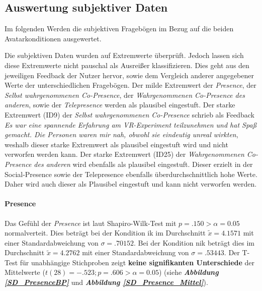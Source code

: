 \documentclass[a4paper,11pt]{article}%
\renewcommand{\\}{\vspace*{0.5\baselineskip} \newline}
\begin{document}

\newpage
\subsection{Auswertung subjektiver Daten}
Im folgenden Werden die subjektiven Fragebögen im Bezug auf die beiden Avatarkonditionen ausgewertet.

Die subjektiven Daten wurden auf Extremwerte überprüft. Jedoch lassen sich diese Extremwerte nicht pauschal als Ausreißer klassifizieren. Dies geht aus den jeweiligen Feedback der Nutzer hervor, sowie dem Vergleich anderer angegebener Werte der unterschiedlichen Fragebögen. Der milde Extremwert der \textit{Presence}, der \textit{Selbst wahrgenommenen Co-Presence}, der \textit{Wahrgenommenen Co-Presence des \dq{}anderen\dq{}}, sowie der \textit{Telepresence} werden als plausibel eingestuft.
Der starke Extremwert (ID9) der \textit{Selbst wahrgenommenen Co-Presence} schrieb als Feedback \dq{}\textit{Es war eine spannende Erfahrung am VR-Experiment teilzunehmen und hat Spaß gemacht. Die Personen waren mir nah, obwohl sie eindeutig unreal wirkten}\dq{}, weshalb dieser starke Extremwert als plausibel eingestuft wird und nicht verworfen werden kann.
Der starke Extremwert (ID25) der \textit{Wahrgenommenen Co-Presence des anderen} wird ebenfalls als plausibel eingestuft. Dieser erzielt in der \dq{}Social-Presence\dq{} sowie der \dq{}Telepresence\dq{} ebenfalls überdurchschnittlich hohe Werte. Daher wird auch dieser als Plausibel eingestuft und kann nicht verworfen werden.

\paragraph{Presence}
Das Gefühl der \textit{Presence} ist laut Shapiro-Wilk-Test mit $p = .150 > \alpha = 0.05$ normalverteit. 
Dies beträgt bei der Kondition \ac{ik} im Durchschnitt $\tilde x = 4.1571$ mit einer Standardabweichung von $\sigma = .70152$.
Bei der Kondition \ac{nik} beträgt dies im Durchschnitt $\tilde x = 4.2762$ mit einer Standardabweichung von $\sigma = .53443$.
Der T-Test für unabhängige Stichproben zeigt \textbf{keine signifikanten Unterschiede} der Mittelwerte ($t(28) = -.523; p = .606 > \alpha = 0.05$) (siehe \textbf{\textit{Abbildung \ref{SD_PresenceBP}}} und \textbf{\textit{Abbildung \ref{SD_Presence_Mittel}}}).
\end{document}
